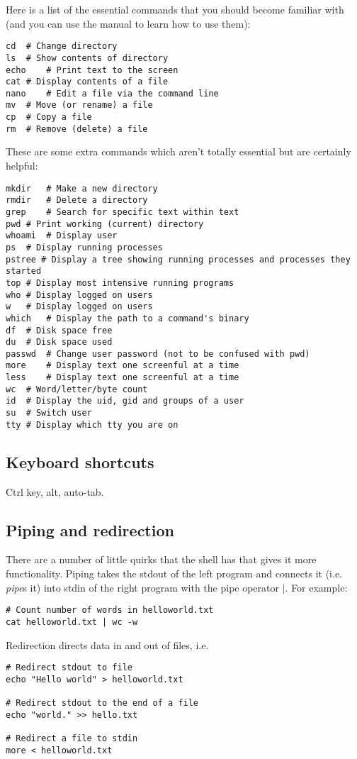 \documentclass{article}
\begin{document}
Here is a list of the essential commands that you should become familiar with (and you can use the manual to learn how to use them): 
\begin{verbatim}
cd	# Change directory
ls	# Show contents of directory
echo	# Print text to the screen
cat	# Display contents of a file
nano	# Edit a file via the command line
mv	# Move (or rename) a file
cp	# Copy a file
rm	# Remove (delete) a file
\end{verbatim}
These are some extra commands which aren't totally essential but are certainly helpful:
\begin{verbatim}
mkdir	# Make a new directory
rmdir	# Delete a directory
grep	# Search for specific text within text
pwd	# Print working (current) directory
whoami	# Display user
ps	# Display running processes
pstree # Display a tree showing running processes and processes they started
top # Display most intensive running programs
who	# Display logged on users
w	# Display logged on users
which	# Display the path to a command's binary
df	# Disk space free
du	# Disk space used
passwd	# Change user password (not to be confused with pwd)
more	# Display text one screenful at a time
less	# Display text one screenful at a time
wc	# Word/letter/byte count
id	# Display the uid, gid and groups of a user
su	# Switch user
tty	# Display which tty you are on
\end{verbatim}

\subsection{Keyboard shortcuts}
Ctrl key, alt, auto-tab.

\subsection{Piping and redirection}
There are a number of little quirks that the shell has that gives it more functionality.
Piping takes the stdout of the left program and connects it (i.e. \emph{pipe}s it) into stdin of the right program with the pipe operator $|$. For example:
\begin{verbatim}
# Count number of words in helloworld.txt
cat helloworld.txt | wc -w 
\end{verbatim}
Redirection directs data in and out of files, i.e. 
\begin{verbatim}
# Redirect stdout to file
echo "Hello world" > helloworld.txt

# Redirect stdout to the end of a file
echo "world." >> hello.txt

# Redirect a file to stdin
more < helloworld.txt
\end{verbatim}
\end{document}
